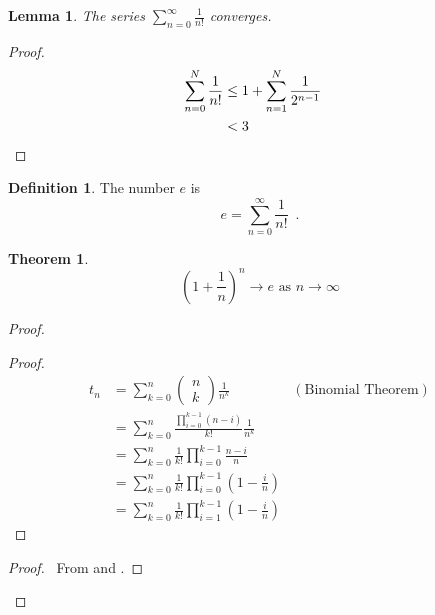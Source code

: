 \documentclass{book}
\let\qed\relax
\newtheorem{thm}[prop]{Theorem}
\newtheorem{lm}[prop]{Lemma}
\theoremstyle{definition}
\newtheorem{df}[prop]{Definition}
\begin{document}
\begin{lm}
The series $\sum_{n=0}^\infty \frac{1}{n!}$ converges.
\end{lm}

\begin{proof}
\pf
\begin{align*}
\sum_{n=0}^N \frac{1}{n!} & \leq 1 + \sum_{n=1}^N \frac{1}{2^{n-1}} \\
& < 3 & \qed
\end{align*}
\end{proof}

\begin{df}
The number $e$ is
\[ e = \sum_{n=0}^\infty \frac{1}{n!} \enspace . \]
\end{df}

\begin{thm}
\[ \left( 1 + \frac{1}{n} \right)^n \rightarrow e \text{ as } n \rightarrow \infty \]
\end{thm}

\begin{proof}
\pf
{}
\begin{proof}
\pf
\begin{align*}
t_n & = \sum_{k=0}^n \left( \begin{array}{c} n \\ k \end{array} \right) \frac{1}{n^k} & (\text{Binomial Theorem}) \\
& = \sum_{k=0}^n \frac{\prod_{i=0}^{k-1} (n-i)}{k!} \frac{1}{n^k} \\
& = \sum_{k=0}^n \frac{1}{k!} \prod_{i=0}^{k-1} \frac{n-i}{n} \\
& = \sum_{k=0}^n \frac{1}{k!} \prod_{i=0}^{k-1} \left( 1 - \frac{i}{n} \right) \\
& = \sum_{k=0}^n \frac{1}{k!} \prod_{i=1}^{k-1} \left( 1 - \frac{i}{n} \right)
\end{align*}
\end{proof}
\begin{proof}
	\pf\ From  and .
\end{proof}
\qed
\end{proof}
\end{document}
